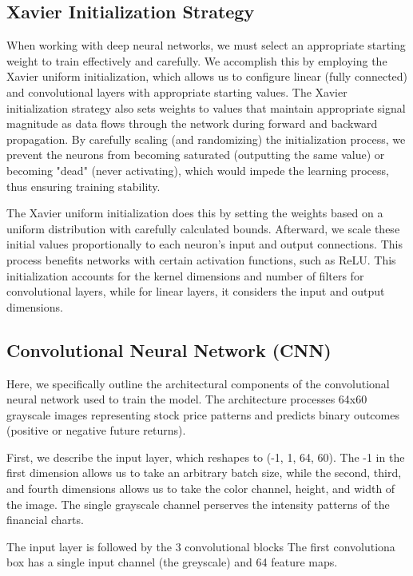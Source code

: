 \documentclass[12pt]{article}
\begin{document}
\subsection*{Xavier Initialization Strategy}

When working with deep neural networks, we must select an appropriate starting weight to train effectively and carefully. We accomplish this by employing the Xavier uniform initialization, which allows us to configure linear (fully connected) and convolutional layers with appropriate starting values. The Xavier initialization strategy also sets weights to values that maintain appropriate signal magnitude as data flows through the network during forward and backward propagation. By carefully scaling (and randomizing) the initialization process, we prevent the neurons from becoming saturated (outputting the same value) or becoming "dead" (never activating), which would impede the learning process, thus ensuring training stability.

The Xavier uniform initialization does this by setting the weights based on a uniform distribution with carefully calculated bounds. Afterward, we scale these initial values proportionally to each neuron's input and output connections. This process benefits networks with certain activation functions, such as ReLU. This initialization accounts for the kernel dimensions and number of filters for convolutional layers, while for linear layers, it considers the input and output dimensions.

\subsection*{Convolutional Neural Network (CNN)}

Here, we specifically outline the architectural components of the convolutional neural network used to train the model. The architecture processes 64x60 grayscale images representing stock price patterns and predicts binary outcomes (positive or negative future returns).

First, we describe the input layer, which reshapes to (-1, 1, 64, 60). The -1 in the first dimension allows us to take an arbitrary batch size, while the second, third, and fourth dimensions allows us to take the color channel, height, and width of the image. The single grayscale channel perserves the intensity patterns of the financial charts. 

The input layer is followed by the 3 convolutional blocks The first convolutiona box has a single input channel (the greyscale) and 64 feature maps.
\end{document}
